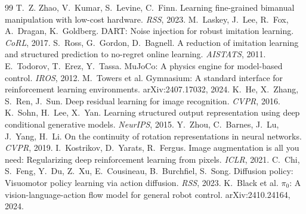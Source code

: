 \documentclass[10pt,twocolumn,letterpaper]{article}
\begin{document}
\small\raggedright
\begin{thebibliography}{99}\itemsep0pt
 T.~Z. Zhao, V.~Kumar, S.~Levine, C.~Finn. Learning fine-grained bimanual manipulation with low-cost hardware. \emph{RSS}, 2023.
 M.~Laskey, J.~Lee, R.~Fox, A.~Dragan, K.~Goldberg. DART: Noise injection for robust imitation learning. \emph{CoRL}, 2017.
 S.~Ross, G.~Gordon, D.~Bagnell. A reduction of imitation learning and structured prediction to no-regret online learning. \emph{AISTATS}, 2011.
 E.~Todorov, T.~Erez, Y.~Tassa. MuJoCo: A physics engine for model-based control. \emph{IROS}, 2012.
 M.~Towers et al. Gymnasium: A standard interface for reinforcement learning environments. arXiv:2407.17032, 2024.
 K.~He, X.~Zhang, S.~Ren, J.~Sun. Deep residual learning for image recognition. \emph{CVPR}, 2016.
 K.~Sohn, H.~Lee, X.~Yan. Learning structured output representation using deep conditional generative models. \emph{NeurIPS}, 2015.
 Y.~Zhou, C.~Barnes, J.~Lu, J.~Yang, H.~Li. On the continuity of rotation representations in neural networks. \emph{CVPR}, 2019.
 I.~Kostrikov, D.~Yarats, R.~Fergus. Image augmentation is all you need: Regularizing deep reinforcement learning from pixels. \emph{ICLR}, 2021.
 C.~Chi, S.~Feng, Y.~Du, Z.~Xu, E.~Cousineau, B.~Burchfiel, S.~Song. Diffusion policy: Visuomotor policy learning via action diffusion. \emph{RSS}, 2023.
 K.~Black et al. $\pi_0$: A vision-language-action flow model for general robot control. arXiv:2410.24164, 2024.
\end{thebibliography}
\end{document}
